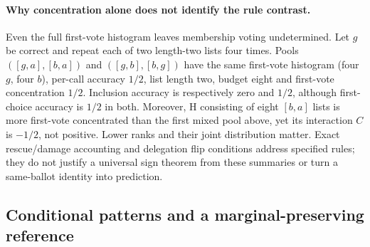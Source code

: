 \paragraph{Why concentration alone does not identify the rule contrast.}
Even the full first-vote histogram leaves membership voting undetermined. Let $g$ be correct and repeat each of two length-two lists four times. Pools $([g,a],[b,a])$ and $([g,b],[b,g])$ have the same first-vote histogram (four $g$, four $b$), per-call accuracy $1/2$, list length two, budget eight and first-vote concentration $1/2$. Inclusion accuracy is respectively zero and $1/2$, although first-choice accuracy is $1/2$ in both. Moreover, H consisting of eight $[b,a]$ lists is more first-vote concentrated than the first mixed pool above, yet its interaction $C$ is $-1/2$, not positive. Lower ranks and their joint distribution matter. Exact rescue/damage accounting \citep{ali2026lift} and delegation flip conditions \citep{sakai2026delegation} address specified rules; they do not justify a universal sign theorem from these summaries or turn a same-ballot identity into prediction.

\subsection{Conditional patterns and a marginal-preserving reference}\label{app:conditional}

